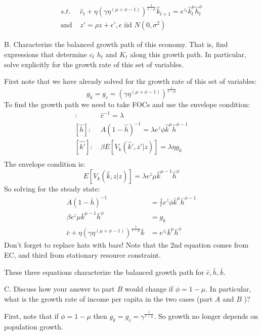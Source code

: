\documentclass[answers]{exam}
\begin{document}
\begin{questions}
\begin{solution}
\begin{align*}
        s.t.\ &\hat{c}_t + \eta  (\gamma \eta^{(\mu+\phi-1)})^\frac{1}{1-\mu} \hat{k}_{t+1} = e^{z_t} \hat{k}_t^\mu \hat{h}_t^\phi\\
        \text{and } &z' = \rho z + \epsilon', \epsilon \text{ iid } N(0,\sigma^2)
    \end{align*}
\end{solution}
B. Characterize the balanced growth path of this economy. That is, find expressions that determine $c_{t}$ $h_{t}$ and $K_{t}$ along this growth path. In particular, solve explicitly for the growth rate of this set of variables.
\begin{solution}
    First note that we have already solved for thr growth rate of this set of variables:
    $$g_k = g_c = (\gamma \eta^{(\mu+\phi-1)})^\frac{1}{1-\mu}$$
    To find the growth path we need to take FOCs and use the envelope condition:
    \begin{align*}
        [\hat{c}]:\ &\hat{c}^{-1} = \lambda\\
        [\hat{h}]:\ &A(1-\hat{h})^{-1} = \lambda e^{z} \phi \hat{k}^\mu \hat{h}^{\phi-1}\\
        [\hat{k'}]:\ &\beta E[V_k(\hat{k}',z'|z)] = \lambda \eta g_k\\
    \end{align*}
    The envelope condition is:
    $$E[V_k(\hat{k},z|z)] = \lambda e^{z} \mu \hat{k}^{\mu-1} \hat{h}^\phi$$
    So solving for the steady state:
    \begin{align*} 
        A(1-\bar{h})^{-1} &= \frac{1}{\bar{c}} e^{z} \phi \bar{k}^\mu \bar{h}^{\phi-1}\\
        \beta e^{z} \mu \bar{k}^{\mu-1} \bar{h}^\phi &= g_k\\
        \bar{c} + \eta  (\gamma \eta^{(\mu+\phi-1)})^\frac{1}{1-\mu} \bar{k} &= e^{z_t} \bar{k}^\mu \bar{h}^\phi
    \end{align*}
    Don't forget to replace hats with bars! Note that the 2nd equation comes from EC, and third from stationary resource constraint.

    These three equations characterize the balanced growth path for $\bar{c}, \bar{h}, \bar{k}$. 
\end{solution}
C. Discuss how your answer to part $B$ would change if $\phi=1-\mu$. In particular, what is the growth rate of income per capita in the two cases (part $A$ and $B$ )?
\begin{solution}
    First, note that if $\phi=1-\mu$ then $g_k = g_c = \gamma^\frac{1}{1-\mu}$. So growth no longer depends on population growth. 


\end{solution}
\end{questions}
\end{document}
